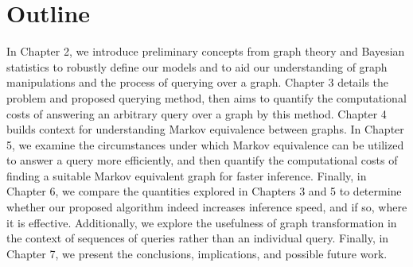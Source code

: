 \section{Outline}
\null \quad \quad In Chapter 2, we introduce preliminary concepts from graph theory and Bayesian statistics to robustly define our models and to aid our understanding of graph manipulations and the process of querying over a graph. Chapter 3 details the problem and proposed querying method, then aims to quantify the computational costs of answering an arbitrary query over a graph by this method. Chapter 4 builds context for understanding Markov equivalence between graphs. In Chapter 5, we examine the circumstances under which Markov equivalence can be utilized to answer a query more efficiently, and then quantify the computational costs of finding a suitable Markov equivalent graph for faster inference. Finally, in Chapter 6, we compare the quantities explored in Chapters 3 and 5 to determine whether our proposed algorithm indeed increases inference speed, and if so, where it is effective. Additionally, we explore the usefulness of graph transformation in the context of sequences of queries rather than an individual query. Finally, in Chapter 7, we present the conclusions, implications, and possible future work. 